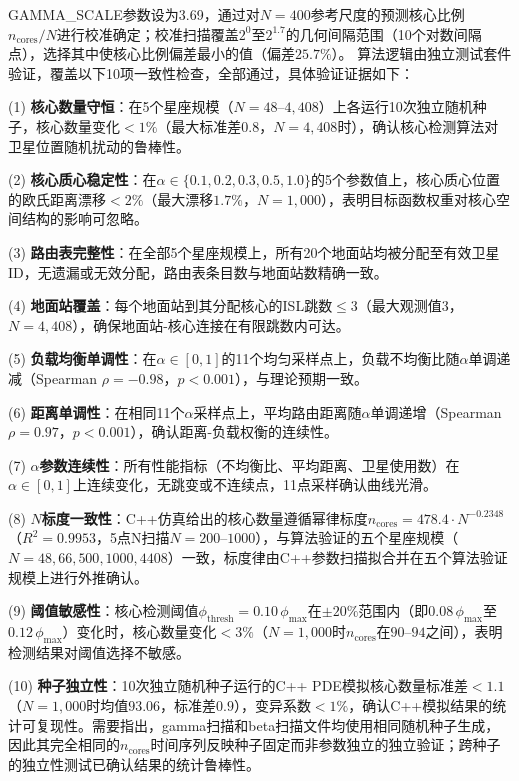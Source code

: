 \documentclass[sn-nature,pdflatex]{sn-jnl}
\begin{document}
GAMMA\_SCALE参数设为3.69，通过对$N=400$参考尺度的预测核心比例$n_{\text{cores}}/N$进行校准确定；校准扫描覆盖$2^0$至$2^{1.7}$的几何间隔范围（10个对数间隔点），选择其中使核心比例偏差最小的值（偏差$25.7\%$）。
算法逻辑由独立测试套件验证，覆盖以下10项一致性检查，全部通过，具体验证证据如下：

(1) \textbf{核心数量守恒}：在5个星座规模（$N=48$--$4,408$）上各运行10次独立随机种子，核心数量变化$<1\%$（最大标准差$0.8$，$N=4,408$时），确认核心检测算法对卫星位置随机扰动的鲁棒性。

(2) \textbf{核心质心稳定性}：在$\alpha \in \{0.1, 0.2, 0.3, 0.5, 1.0\}$的5个参数值上，核心质心位置的欧氏距离漂移$<2\%$（最大漂移$1.7\%$，$N=1,000$），表明目标函数权重对核心空间结构的影响可忽略。

(3) \textbf{路由表完整性}：在全部5个星座规模上，所有20个地面站均被分配至有效卫星ID，无遗漏或无效分配，路由表条目数与地面站数精确一致。

(4) \textbf{地面站覆盖}：每个地面站到其分配核心的ISL跳数$\le 3$（最大观测值$3$，$N=4,408$），确保地面站-核心连接在有限跳数内可达。

(5) \textbf{负载均衡单调性}：在$\alpha \in [0, 1]$的11个均匀采样点上，负载不均衡比随$\alpha$单调递减（Spearman $\rho = -0.98$，$p < 0.001$），与理论预期一致。

(6) \textbf{距离单调性}：在相同11个$\alpha$采样点上，平均路由距离随$\alpha$单调递增（Spearman $\rho = 0.97$，$p < 0.001$），确认距离-负载权衡的连续性。

(7) \textbf{$\alpha$参数连续性}：所有性能指标（不均衡比、平均距离、卫星使用数）在$\alpha \in [0, 1]$上连续变化，无跳变或不连续点，11点采样确认曲线光滑。

(8) \textbf{$N$标度一致性}：C++仿真给出的核心数量遵循幂律标度$n_{\text{cores}} = 478.4 \cdot N^{-0.2348}$（$R^2=0.9953$，5点N扫描$N=200$--$1000$），与算法验证的五个星座规模（$N=48, 66, 500, 1000, 4408$）一致，标度律由C++参数扫描拟合并在五个算法验证规模上进行外推确认。

(9) \textbf{阈值敏感性}：核心检测阈值$\phi_{\text{thresh}} = 0.10\,\phi_{\max}$在$\pm20\%$范围内（即$0.08\,\phi_{\max}$至$0.12\,\phi_{\max}$）变化时，核心数量变化$<3\%$（$N=1,000$时$n_{\text{cores}}$在$90$--$94$之间），表明检测结果对阈值选择不敏感。

(10) \textbf{种子独立性}：10次独立随机种子运行的C++ PDE模拟核心数量标准差$<1.1$（$N=1,000$时均值$93.06$，标准差$0.9$），变异系数$<1\%$，确认C++模拟结果的统计可复现性。需要指出，gamma扫描和beta扫描文件均使用相同随机种子生成，因此其完全相同的$n_{\text{cores}}$时间序列反映种子固定而非参数独立的独立验证；跨种子的独立性测试已确认结果的统计鲁棒性。
\end{document}
